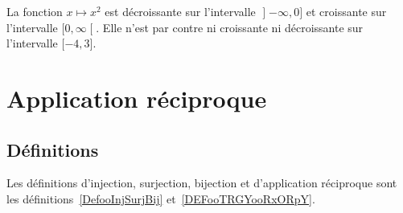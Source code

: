 \begin{example}
	La fonction \( x\mapsto x^2\) est décroissante sur l'intervalle \( \mathopen] -\infty , 0 \mathclose]\) et croissante sur l'intervalle \( \mathopen[ 0 , \infty \mathclose[\). Elle n'est par contre ni croissante ni décroissante sur l'intervalle \( \mathopen[ -4 , 3 \mathclose]\).
\end{example}

\section{Application réciproque}

\subsection{Définitions}

Les définitions d'injection, surjection, bijection et d'application réciproque sont les définitions~\ref{DefooInjSurjBij} et~\ref{DEFooTRGYooRxORpY}.

